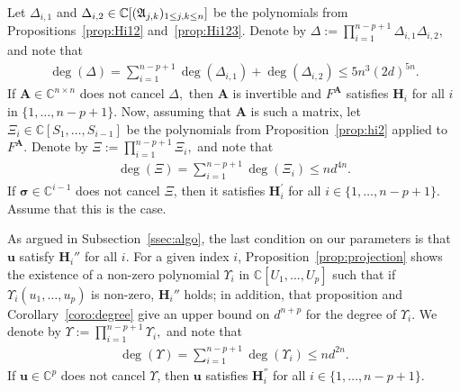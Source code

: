 \documentclass[12pt]{article}
\def\mA{{\bm A}}
\def\ub{{\bm u}}
\def\D{\Delta}
\def\C{\mathbb{C}}
\begin{document}
Let $\Delta_{i,1}$ and $\Delta_{i,2} \in \C[(\frak A_{j,k})_{1\le j,k
    \le n}]$ be the polynomials from Propositions~\ref{prop:Hi12}
and~\ref{prop:Hi123}. Denote by $\Delta := \prod_{i=1}^{n-p+1}
\D_{i,1}\D_{i,2},$ and note that
\begin{align}
    \deg( \Delta) = \sum_{i=1}^{n-p+1} \deg( \D_{i,1})+\deg(\D_{i,2})
    \leq 5n^3(2d)^{5n}.
\end{align}
If $\mA \in \C^{n \times n}$ does not cancel $\Delta,$ then $\mA$ is
invertible and $F^\mA$ satisfies $\bm H_i$ for all $i$ in
$\{1,\hdots,n-p+1\}.$ Now, assuming that $\mA$ is such a matrix, let
$\Xi_i\in \C[S_1,\dots,S_{i-1}]$ be the polynomials from
Proposition~\ref{prop:hi2} applied to $F^{\mA}.$ Denote by $\Xi :=
\prod_{i=1}^{n-p+1} \Xi_i,$ and note that
\begin{align}
    \deg( \Xi)= \sum_{i=1}^{n-p+1} \deg( \Xi_i) \leq nd^{4n}.
\end{align}
If $\bm \sigma \in \C^{i-1}$ does not cancel $\Xi$, then it satisfies
$\bm H_i^{'}$ for all $i \in \{1,\hdots,n-p+1\}.$ Assume that this is
the case.

As argued in Subsection~\ref{ssec:algo}, the last condition on our
parameters is that $\bm u$ satisfy $\bm H_i''$ for all $i$. For a
given index $i$, Proposition~\ref{prop:projection} shows the existence
of a non-zero polynomial $\Upsilon_i$ in $\C[U_1,\dots,U_p]$ such that
if $\Upsilon_i(u_1,\dots,u_p)$ is non-zero, $\bm H_i''$ holds; in
addition, that proposition and Corollary~\ref{coro:degree} give an
upper bound on $d^{n+p}$ for the degree of $\Upsilon_i$. We denote by
$\Upsilon := \prod_{i=1}^{n-p+1} \Upsilon_i,$ and note that
\begin{align}
    \deg( \Upsilon) = \sum_{i=1}^{n-p+1} \deg( \Upsilon_i) \leq nd^{2n}.
\end{align}
If $\ub \in \C^{p}$ does not cancel $\Upsilon$, then $\ub$ satisfies $\bm H_i^{''}$ for all $i \in
\{1,\hdots,n-p+1\}.$
\end{document}
